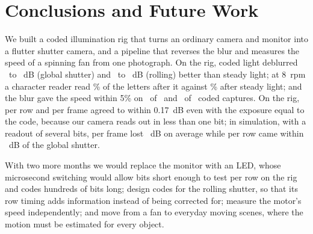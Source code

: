 \section{Conclusions and Future Work}
\label{sec:conclusion}

We built a coded illumination rig that turns an ordinary camera and monitor into a flutter shutter
camera, and a pipeline that reverses the blur and measures the speed of a spinning fan from one
photograph. On the rig, coded light deblurred \rigGapMin~to \rigGapMax~dB (global shutter) and
\rigRsGapMin~to \rigRsGapMax~dB (rolling) better than steady light; at \SI{8}{rpm} a character reader
read \rigReadCodedEight\% of the letters after it against \rigReadSteadyEight\% after steady light; and
the blur gave the speed within 5\% on \rigSpeedWithinCoded~of \rigSpeedAllCoded~and \rigSpeedWithinRsCoded~of
\rigSpeedAllRsCoded~coded captures. On the rig, per row and per frame agreed to within \SI{0.17}{dB} even with the exposure equal to the code, because our camera reads out in less than one bit; in simulation, with a readout of several bits, per frame lost \rowsShortDropA~dB on average while per row came within \rowsMaxMeanGapA~dB of the global shutter. 

With two more months we would replace the monitor with an LED, whose microsecond switching would allow bits short enough to test per row on the rig and codes hundreds of bits long; design codes for the rolling shutter, so that its row timing adds information instead of being corrected for; measure the motor's speed independently; and move from a fan to everyday moving scenes, where the motion must be estimated for every object.
